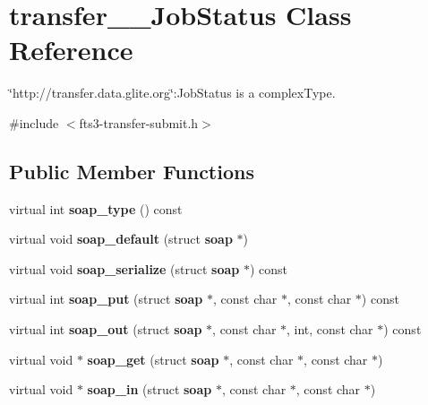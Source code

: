 \section{transfer\_\-\_\-JobStatus Class Reference}
\label{classtransfer____JobStatus}


\char`\"{}http://transfer.data.glite.org\char`\"{}:JobStatus is a complexType.  




{\ttfamily \#include $<$fts3-\/transfer-\/submit.h$>$}

\subsection*{Public Member Functions}
\begin{DoxyCompactItemize}
\item 
virtual int {\bfseries soap\_\-type} () const \label{classtransfer____JobStatus_adf3c576598572fc4ef23425136034da6}

\item 
virtual void {\bfseries soap\_\-default} (struct {\bf soap} $\ast$)\label{classtransfer____JobStatus_ab2066b2d6e93b4ddbdb494dc00957411}

\item 
virtual void {\bfseries soap\_\-serialize} (struct {\bf soap} $\ast$) const \label{classtransfer____JobStatus_a59955cd1d7800231b9e1bb42a4c8fe74}

\item 
virtual int {\bfseries soap\_\-put} (struct {\bf soap} $\ast$, const char $\ast$, const char $\ast$) const \label{classtransfer____JobStatus_aea9fe3403040242176130c4b5cbb78bf}

\item 
virtual int {\bfseries soap\_\-out} (struct {\bf soap} $\ast$, const char $\ast$, int, const char $\ast$) const \label{classtransfer____JobStatus_a31bacb77f8ced8a26ef3c3ad9c2cf7c1}

\item 
virtual void $\ast$ {\bfseries soap\_\-get} (struct {\bf soap} $\ast$, const char $\ast$, const char $\ast$)\label{classtransfer____JobStatus_a173df825f18c08ec4d828834aac7f890}

\item 
virtual void $\ast$ {\bfseries soap\_\-in} (struct {\bf soap} $\ast$, const char $\ast$, const char $\ast$)\label{classtransfer____JobStatus_a379591ad7d9c0468b358d3ad8f0e31c1}

\end{DoxyCompactItemize}
